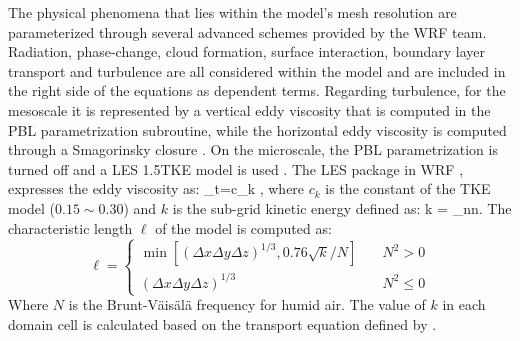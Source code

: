 The physical phenomena that lies within the model's mesh resolution are parameterized through several advanced schemes provided by the WRF team. Radiation, phase-change, cloud formation, surface interaction, boundary layer transport and turbulence are all considered within the model and are included in the right side of the equations as dependent terms. Regarding turbulence, for the mesoscale it is represented by a vertical eddy viscosity that is computed in the PBL parametrization subroutine, while the horizontal eddy viscosity is computed through a Smagorinsky closure \citep{smagorinsky1963general}. On the microscale, the PBL parametrization is turned off and a LES 1.5TKE  model is used \citep{deardorff1980stratocumulus}. The LES package in WRF \citep{Yamaguchi2012}, expresses the eddy viscosity as:
\be 
\nu_{t}=c_k \ell {},
\ee
where $c_k$ is the constant of the TKE model ($0.15\sim\! 0.30$) and $k$ is the sub-grid kinetic energy defined as:
\be 
k = \tau_{nn}.
\ee 
The characteristic length $\ell$ of the model is computed as:
\begin{equation}
\ell = \begin{cases}\min[(\Delta x \Delta y \Delta z)^{1/3}, 0.76\sqrt{k}/N]&\quad N^2>0\\
(\Delta x \Delta y \Delta z)^{1/3}&\quad N^2\leq 0\end{cases}
\end{equation}
Where $N$ is the Brunt-Väisälä frequency for humid air. The value of $k$ in each domain cell is calculated based on the transport equation defined by  \cite{https://doi.org/10.5065/d68s4mvh}.

